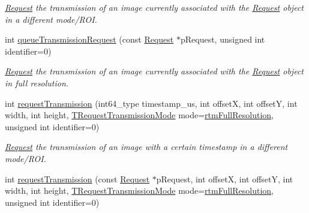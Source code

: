 \begin{DoxyCompactItemize}
\begin{DoxyCompactList}\small\item\em \hyperlink{classmv_i_m_p_a_c_t_1_1acquire_1_1_request}{Request} the transmission of an image currently associated with the \hyperlink{classmv_i_m_p_a_c_t_1_1acquire_1_1_request}{Request} object in a different mode/\+R\+O\+I. \end{DoxyCompactList}\item 
int \hyperlink{classmv_i_m_p_a_c_t_1_1acquire_1_1_gen_i_cam_1_1_custom_command_generator_a4adb1d8d864e7aa9647ef646d1f43074}{queue\+Transmission\+Request} (const \hyperlink{classmv_i_m_p_a_c_t_1_1acquire_1_1_request}{Request} $\ast$p\+Request, unsigned int identifier=0)
\begin{DoxyCompactList}\small\item\em \hyperlink{classmv_i_m_p_a_c_t_1_1acquire_1_1_request}{Request} the transmission of an image currently associated with the \hyperlink{classmv_i_m_p_a_c_t_1_1acquire_1_1_request}{Request} object in full resolution. \end{DoxyCompactList}\item 
int \hyperlink{classmv_i_m_p_a_c_t_1_1acquire_1_1_gen_i_cam_1_1_custom_command_generator_a12316a89a5d4925deea45c067bb7d046}{request\+Transmission} (int64\+\_\+type timestamp\+\_\+us, int offset\+X, int offset\+Y, int width, int height, \hyperlink{group___gen_i_cam_interface_ga5817a4e9c4ac30a320103ae1cec95cb9}{T\+Request\+Transmission\+Mode} mode=\hyperlink{group___gen_i_cam_interface_gga5817a4e9c4ac30a320103ae1cec95cb9aa8d28f2764e3f2869ec70d36a2ce2366}{rtm\+Full\+Resolution}, unsigned int identifier=0)
\begin{DoxyCompactList}\small\item\em \hyperlink{classmv_i_m_p_a_c_t_1_1acquire_1_1_request}{Request} the transmission of an image with a certain timestamp in a different mode/\+R\+O\+I. \end{DoxyCompactList}\item 
int \hyperlink{classmv_i_m_p_a_c_t_1_1acquire_1_1_gen_i_cam_1_1_custom_command_generator_a9458021595d92ab729fa99dcdf4a50cc}{request\+Transmission} (const \hyperlink{classmv_i_m_p_a_c_t_1_1acquire_1_1_request}{Request} $\ast$p\+Request, int offset\+X, int offset\+Y, int width, int height, \hyperlink{group___gen_i_cam_interface_ga5817a4e9c4ac30a320103ae1cec95cb9}{T\+Request\+Transmission\+Mode} mode=\hyperlink{group___gen_i_cam_interface_gga5817a4e9c4ac30a320103ae1cec95cb9aa8d28f2764e3f2869ec70d36a2ce2366}{rtm\+Full\+Resolution}, unsigned int identifier=0)

\end{DoxyCompactItemize}
